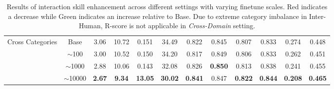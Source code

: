 \begin{table}[]
{\begin{tabular}{c|c|cccccccccc}
\multirow{4}{*}{Cross Categories} & Base &   3.06        &       10.72    &     0.151     &   34.49  &  0.822   &     0.845      &    0.807     &     0.833    &     0.274      &     0.448  \\ \cline{2-12}& $\sim$100         &     \textcolor[rgb]{0.07,0.55,0.15}{3.00}      &      \textcolor[rgb]{0.07,0.55,0.15}{10.52}     &     \textcolor[rgb]{0.07,0.55,0.15}{0.150}     &   \textcolor[rgb]{0.07,0.55,0.15}{34.20}  &  \textcolor[rgb]{0.77,0.15,0.32}{0.817}   &      \textcolor[rgb]{0.07,0.55,0.15}{0.849}     &  \textcolor[rgb]{0.77,0.15,0.32}{ 0.806 }     &     \textcolor[rgb]{0.77,0.15,0.32}{0.833}    &    \textcolor[rgb]{0.07,0.55,0.15}{ 0.262}      &    \textcolor[rgb]{0.07,0.55,0.15}{0.451 }      \\ \cline{2-12}& $\sim$1000         &    \textcolor[rgb]{0.07,0.55,0.15}{2.88}    &       \textcolor[rgb]{0.07,0.55,0.15}{10.06}    &     \textcolor[rgb]{0.07,0.55,0.15}{ 0.143}     &    \textcolor[rgb]{0.07,0.55,0.15}{32.08}       &   \textcolor[rgb]{0.07,0.55,0.15}{ 0.826}    &    \textcolor[rgb]{0.07,0.55,0.15}{\textbf{0.850}}   &       \textcolor[rgb]{0.07,0.55,0.15}{0.813 }   &     \textcolor[rgb]{0.07,0.55,0.15}{0.838}      &    \textcolor[rgb]{0.07,0.55,0.15}{0.241 }      &    \textcolor[rgb]{0.07,0.55,0.15}{0.455}      \\ \cline{2-12}& $\sim$10000   &  \textcolor[rgb]{0.07,0.55,0.15}{\textbf{2.67}}     &    \textcolor[rgb]{0.07,0.55,0.15}{\textbf{9.34}}       &    \textcolor[rgb]{0.07,0.55,0.15}{\textbf{13.05}}     &    \textcolor[rgb]{0.07,0.55,0.15}{ \textbf{30.02}}      &     \textcolor[rgb]{0.07,0.55,0.15}{\textbf{0.841}}   &     \textcolor[rgb]{0.07,0.55,0.15}{0.847}   &      \textcolor[rgb]{0.07,0.55,0.15}{\textbf{0.822}}    &    \textcolor[rgb]{0.07,0.55,0.15}{\textbf{0.844}}   &    \textcolor[rgb]{0.07,0.55,0.15}{\textbf{0.208}}    &      \textcolor[rgb]{0.07,0.55,0.15}{\textbf{0.465}}    \\ \hline
\end{tabular}
}
\caption{Results of interaction skill enhancement across different settings with varying finetune scales. \textcolor[rgb]{0.77,0.15,0.32}{Red} indicates a decrease while \textcolor[rgb]{0.07,0.55,0.15}{Green} indicates an increase relative to Base. Due to extreme category imbalance in Inter-Human, R-score is not applicable in \textit{Cross-Domain} setting.}
\vspace{-4ex}
\label{tab:finetune}
\end{table}